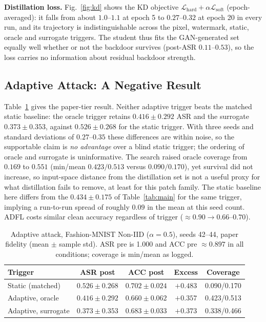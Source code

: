 \documentclass[conference]{IEEEtran}
\begin{document}
\textbf{Distillation loss.} Fig.~\ref{fig:kd} shows the KD objective $\mathcal{L}_{\mathrm{hard}}+\alpha\mathcal{L}_{\mathrm{soft}}$ (epoch-averaged): it falls from about $1.0$--$1.1$ at epoch 5 to $0.27$--$0.32$ at epoch 20 in every run, and its trajectory is indistinguishable across the pixel, watermark, static, oracle and surrogate triggers. The student thus fits the GAN-generated set equally well whether or not the backdoor survives (post-ASR $0.11$--$0.53$), so the loss carries no information about residual backdoor strength.

\subsection{Adaptive Attack: A Negative Result}
\label{sec:adaptive}
Table~\ref{tab:adaptive} gives the paper-tier result. Neither adaptive trigger beats the matched static baseline: the oracle trigger retains $0.416\pm0.292$ ASR and the surrogate $0.373\pm0.353$, against $0.526\pm0.268$ for the static trigger. With three seeds and standard deviations of $0.27$--$0.35$ these differences are within noise, so the supportable claim is \emph{no advantage} over a blind static trigger; the ordering of oracle and surrogate is uninformative. The search raised oracle coverage from $0.169$ to $0.551$ (min/mean $0.423/0.513$ versus $0.090/0.170$), yet survival did not increase, so input-space distance from the distillation set is not a useful proxy for what distillation fails to remove, at least for this patch family. The static baseline here differs from the $0.434\pm0.175$ of Table~\ref{tab:main} for the same trigger, implying a run-to-run spread of roughly $0.09$ in the mean at this seed count. %
ADFL costs similar clean accuracy regardless of trigger ($\approx0.90\to0.66$--$0.70$).

\begin{table}[t]
\centering
\caption{Adaptive attack, Fashion-MNIST Non-IID ($\alpha=0.5$), seeds 42--44, paper fidelity (mean $\pm$ sample std). ASR pre is 1.000 and ACC pre $\approx0.897$ in all conditions; coverage is min/mean as logged.}
\label{tab:adaptive}
\footnotesize
\setlength{\tabcolsep}{2pt}
\begin{tabular}{lcccc}
\toprule
Trigger & ASR post & ACC post & Excess & Coverage \\
\midrule
Static (matched) & $0.526\pm0.268$ & $0.702\pm0.024$ & $+0.483$ & 0.090/0.170 \\
Adaptive, oracle & $0.416\pm0.292$ & $0.660\pm0.062$ & $+0.357$ & 0.423/0.513 \\
Adaptive, surrogate & $0.373\pm0.353$ & $0.683\pm0.033$ & $+0.373$ & 0.338/0.466 \\
\bottomrule
\end{tabular}
\end{table}
\end{document}
